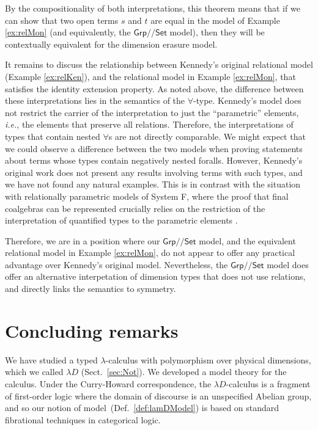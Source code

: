 \documentclass[a4paper,UKenglish]{lipics}
\newcommand{\msf}[1]{\mathsf{#1}} %
\newcommand{\Grp}{\msf{Grp}}
\newcommand{\Set}{\msf{Set}}
\newcommand{\Lslice}[1]{#1/\!/\Set}
\newcommand{\GrpSet}{\Lslice{\Grp}}
\begin{document}
\noindent
By the compositionality of both interpretations, this theorem means
that if we can show that two open terms $s$ and $t$ are equal in the
model of Example \ref{ex:relMon} (and equivalently, the $\GrpSet$
model), then they will be contextually equivalent for the dimension
erasure model.

It remains to discuss the relationship between Kennedy's original relational model (Example \ref{ex:relKen}), and the relational model in Example \ref{ex:relMon}, that satisfies the identity extension property. As noted above, the difference between these interpretations lies in the semantics of the $\forall$-type. Kennedy's model does not restrict the carrier of the interpretation to just the ``parametric'' elements, \emph{i.e.}, the elements that preserve all relations. Therefore, the interpretations of types that contain nested $\forall$s are not directly comparable. We might expect that we could observe a difference between the two models when proving statements about terms whose types contain negatively nested foralls. However, Kennedy's original work does not present any results involving terms with such types, and we have not found any natural examples. This is in contrast with the situation with relationally parametric models of System F, where the proof that final coalgebras can be represented crucially relies on the restriction of the interpretation of quantified types to the parametric elements \cite{birkedal2005categorical}.

Therefore, we are in a position where our $\GrpSet$ model, and the
equivalent relational model in Example \ref{ex:relMon}, do not appear
to offer any practical advantage over Kennedy's original
model. Nevertheless, the $\GrpSet$ model does offer an alternative
interpetation of dimension types that does not use relations, and
directly links the semantics to symmetry.

\section{Concluding remarks} \label{sec:con}
We have studied
a typed $\lambda$-calculus with polymorphism over physical dimensions,
which we called $\lambda D$ (Sect.~\ref{sec:Not}).
We developed a model theory for the calculus.
Under the Curry-Howard correspondence, the $\lambda D$-calculus is a
fragment of first-order logic where the domain of discourse is an unspecified Abelian group,
and so our notion of model~(Def.~\ref{def:lamDModel})
is based on standard fibrational techniques in categorical logic.
\end{document}
